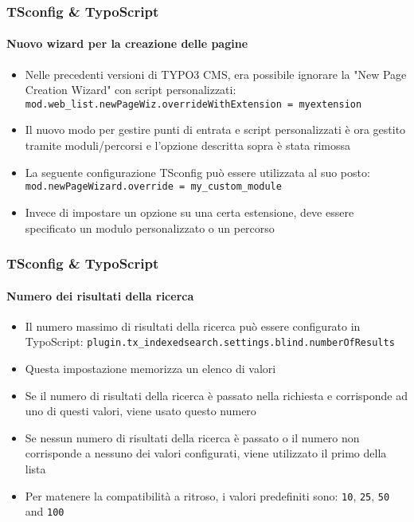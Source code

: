 \begin{frame}[fragile]
	\frametitle{TSconfig \& TypoScript}
	\framesubtitle{Nuovo wizard per la creazione delle pagine}

	\begin{itemize}
		\item Nelle precedenti versioni di TYPO3 CMS, era possibile ignorare la "New Page Creation Wizard"
			con script personalizzati:\newline
			\small
				\texttt{mod.web\_list.newPageWiz.overrideWithExtension = myextension}
			\normalsize
		\item Il nuovo modo per gestire punti di entrata e script personalizzati è ora gestito tramite moduli/percorsi
			e l'opzione descritta sopra è stata rimossa
		\item La seguente configurazione TSconfig può essere utilizzata al suo posto:
			\small
				\texttt{mod.newPageWizard.override = my\_custom\_module}
			\normalsize

		\item Invece di impostare un opzione su una certa estensione, deve essere specificato un modulo personalizzato o
			un percorso 

	\end{itemize}

\end{frame}
\begin{frame}[fragile]
	\frametitle{TSconfig \& TypoScript}
	\framesubtitle{Numero dei risultati della ricerca}

	\begin{itemize}
		\item Il numero massimo di risultati della ricerca può essere configurato in TypoScript:\newline
			\texttt{plugin.tx\_indexedsearch.settings.blind.numberOfResults}
		\item Questa impostazione memorizza un elenco di valori
		\item Se il numero di risultati della ricerca è passato nella richiesta e corrisponde ad uno di questi
			valori, viene usato questo numero
		\item Se nessun numero di risultati della ricerca è passato o il numero non corrisponde a nessuno dei
			valori configurati, viene utilizzato il primo della lista
		\item Per matenere la compatibilità a ritroso, i valori predefiniti sono:\newline
			\texttt{10}, \texttt{25}, \texttt{50} and \texttt{100}
	\end{itemize}

\end{frame}
